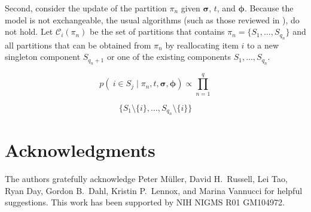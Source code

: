 \documentclass[lineno]{biometrika-dbd}
\newcommand{\draft}[1]{\iftoggle{draft}{#1}{}}
\newcommand{\partition}{\ensuremath{\pi}}
\newcommand{\given}{\mid}
\newcommand{\DBD}[1]{\draft{{\color{red} DBD: #1}}}
\begin{document}
Second, consider the update of the partition $\partition_n$ given
$\bm{\sigma}$, $t$, and $\bm{\phi}$.  Because the model is not exchangeable,
the usual algorithms (such as those reviewed in \citet{neal:2000}), do not
hold.  Let $\mathcal{C}_i(\partition_n)$ be the set of partitions that contains
$\partition_n = \{ S_1, \ldots, S_{q_n}\}$ and all partitions that can be obtained from $\partition_n$
by reallocating item $i$ to a new singleton component $S_{q_n+1}$ or one of the
existing components $S_1,\ldots,S_{q_n}$.

\[
p( \ i \in S_j \given \partition_n, t, \bm{\sigma}, \bm{\phi} ) \propto \prod_{n=1}^q
\]

\[
\{ S_1 \setminus \{i\}, \ldots, S_{q_n} \setminus \{i\} \}
\]

%    
%    
%    
%    
%    
%    
%    

\section*{Acknowledgments}

The authors gratefully acknowledge Peter M\"{u}ller, David H.\ Russell, Lei Tao, Ryan Day, Gordon B.\ Dahl,
Kristin P.\ Lennox, and Marina Vannucci for helpful suggestions.
This work has been supported by NIH NIGMS R01 GM104972.




% 
\end{document}
